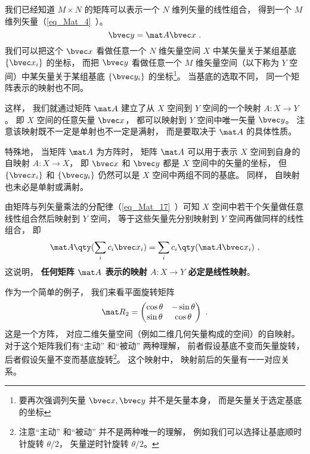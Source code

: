 


我们已经知道 $M\times N$ 的矩阵可以表示一个 $N$ 维列矢量的线性组合， 得到一个 $M$ 维列矢量（\autoref{eq_Mat_4}~）。
\begin{equation}\label{eq_MatLS_1}
\bvec y = \mat A \bvec x~.
\end{equation}
我们可以把这个 $\bvec x$ 看做任意一个 $N$ 维矢量空间 $X$ 中某矢量关于某组基底 $\{\bvec x_i\}$ 的坐标， 而把 $\bvec y$ 看做任意一个 $M$ 维矢量空间（以下称为 $Y$ 空间）中某矢量关于某组基底 $\{\bvec y_i\}$ 的坐标\footnote{要再次强调列矢量 $\bvec x, \bvec y$ 并不是矢量本身， 而是矢量关于选定基底的坐标}。 当基底的选取不同， 同一个矩阵表示的映射也不同。

这样， 我们就通过矩阵 $\mat A$ 建立了从 $X$ 空间到 $Y$ 空间的一个映射 $A:X\to Y$。 即 $X$ 空间的任意矢量 $\bvec x$， 都可以映射到 $Y$ 空间中唯一矢量 $\bvec y$。 注意该映射既不一定是单射也不一定是满射， 而是要取决于 $\mat A$ 的具体性质。

特殊地， 当矩阵 $\mat A$ 为方阵时， 矩阵 $\mat A$ 可以用于表示 $X$ 空间到自身的自映射 $A:X\to X$， 即 $\bvec x$ 和 $\bvec y$ 都是 $X$ 空间中的矢量的坐标， 但 $\{\bvec x_i\}$ 和 $\{\bvec y_i\}$ 仍然可以是 $X$ 空间中两组不同的基底。 同样， 自映射也未必是单射或满射。

由矩阵与列矢量乘法的分配律（\autoref{eq_Mat_17}~）可知 $X$ 空间中若干个矢量做任意线性组合然后映射到 $Y$ 空间， 等于这些矢量先分别映射到 $Y$ 空间再做同样的线性组合， 即
\begin{equation}
\mat A \qty(\sum_i c_i \bvec x_i) = \sum_i c_i \qty(\mat A \bvec x_i)~,
\end{equation}
这说明， \textbf{任何矩阵 $\mat A$ 表示的映射 $A:X\to Y$ 必定是线性映射}。

作为一个简单的例子， 我们来看平面旋转矩阵
\begin{equation}
\mat R_2 = \begin{pmatrix}
\cos\theta & - \sin\theta\\
\sin\theta &\cos\theta   
\end{pmatrix}~.
\end{equation}
这是一个方阵， 对应二维矢量空间（例如二维几何矢量构成的空间）的自映射。 对于这个矩阵我们有“主动” 和“被动” 两种理解， 前者假设基底不变而矢量旋转， 后者假设矢量不变而基底旋转\footnote{注意“主动” 和“被动” 并不是两种唯一的理解， 例如我们可以选择让基底顺时针旋转 $\theta/2$， 矢量逆时针旋转 $\theta/2$。}。 这个映射中， 映射前后的矢量有一一对应关系。

